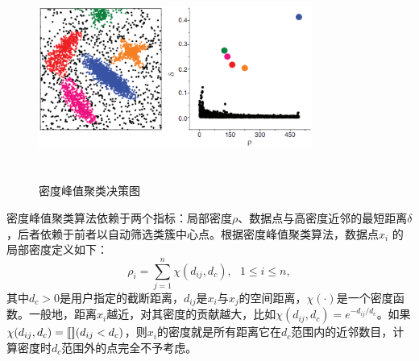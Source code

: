 \begin{figure}[ht]
  \centering
  \includegraphics[width=0.8\textwidth, height=6cm]{figures/densitypeak_decisiongraph.eps}\\
  \caption{密度峰值聚类决策图~\cite{rodriguez2014clustering}}\label{fig:decisiongraph}
\end{figure}

密度峰值聚类算法依赖于两个指标：局部密度$\rho$、数据点与高密度近邻的最短距离$\delta$，后者依赖于前者以自动筛选类簇中心点。根据密度峰值聚类算法，数据点$x_i$ 的局部密度定义如下：
\begin{equation}\label{eq:localdensity}
    \rho_i = \sum\limits_{j=1}^n \chi(d_{ij}, d_c),~~~1\le i\le n,
\end{equation}
其中$d_c>0$是用户指定的截断距离，$d_{ij}$是$x_i$与$x_j$的空间距离，$\chi(\cdot)$是一个密度函数。一般地，距离$x_i$越近，对其密度的贡献越大，比如$\chi(d_{ij}, d_c) = e^{-d_{ij}/d_c}$。如果$\chi(d_{ij},d_c)=\operatorname{[\![]\!]}(d_{ij} < d_c)$，则$x_i$的密度就是所有距离它在$d_c$范围内的近邻数目，计算密度时$d_c$范围外的点完全不予考虑。

